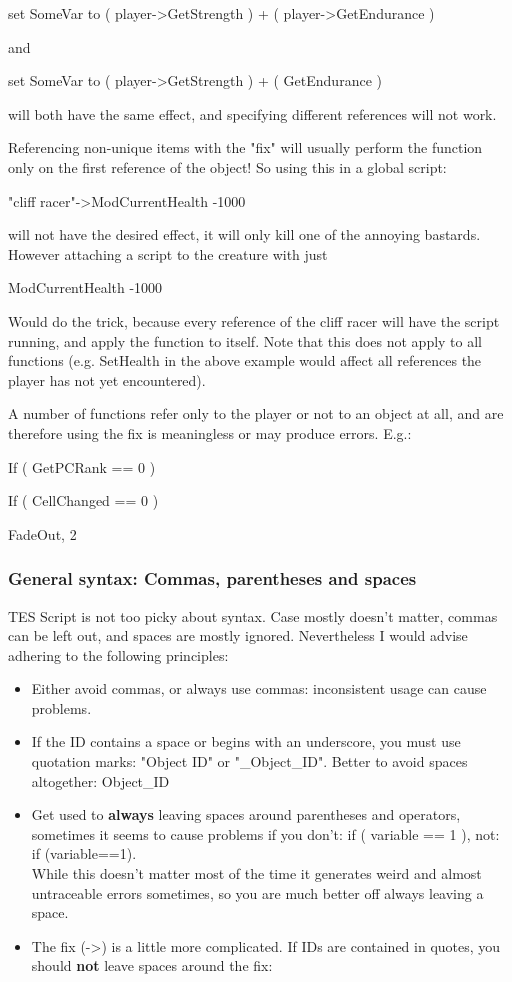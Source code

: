 \documentclass[
]{article}
\begin{document}
set SomeVar to ( player-\textgreater GetStrength ) + (
player-\textgreater GetEndurance )

and

set SomeVar to ( player-\textgreater GetStrength ) + ( GetEndurance )

will both have the same effect, and specifying different references will
not work.

Referencing non-unique items with the "fix" will usually perform the
function only on the first reference of the object! So using this in a
global script:

"cliff racer"-\textgreater ModCurrentHealth -1000

will not have the desired effect, it will only kill one of the annoying
bastards. However attaching a script to the creature with just

ModCurrentHealth -1000

Would do the trick, because every reference of the cliff racer will have
the script running, and apply the function to itself. Note that this
does not apply to all functions (e.g. SetHealth in the above example
would affect all references the player has not yet encountered).

A number of functions refer only to the player or not to an object at
all, and are therefore using the fix is meaningless or may produce
errors. E.g.:

If ( GetPCRank == 0 )

If ( CellChanged == 0 )

FadeOut, 2

\hypertarget{general-syntax-commas-parentheses-and-spaces}{%
\subsubsection{General syntax: Commas, parentheses and
spaces}\label{general-syntax-commas-parentheses-and-spaces}}

TES Script is not too picky about syntax. Case mostly doesn't matter,
commas can be left out, and spaces are mostly ignored. Nevertheless I
would advise adhering to the following principles:

\begin{itemize}
\item
  Either avoid commas, or always use commas: inconsistent usage can
  cause problems.
\item
  If the ID contains a space or begins with an underscore, you must use
  quotation marks: "Object ID" or "\_Object\_ID". Better to avoid spaces
  altogether: Object\_ID
\item
  Get used to \textbf{always} leaving spaces around parentheses and
  operators, sometimes it seems to cause problems if you don't: if (
  variable == 1 ), not: if (variable==1).\\
  While this doesn't matter most of the time it generates weird and
  almost untraceable errors sometimes, so you are much better off always
  leaving a space.
\item
  The fix (-\textgreater) is a little more complicated. If IDs are
  contained in quotes, you should \textbf{not} leave spaces around the
  fix:
\end{itemize}
\end{document}
